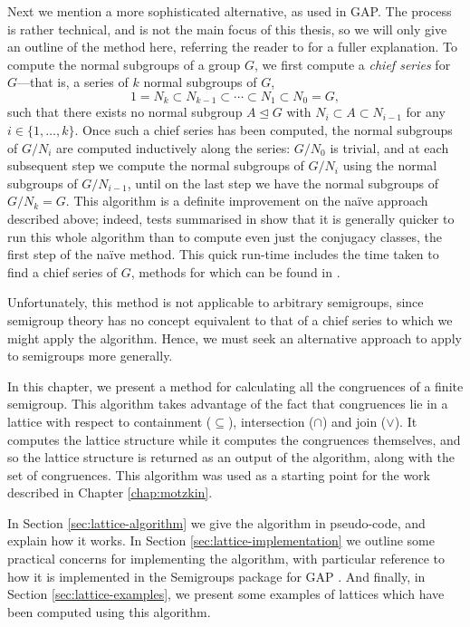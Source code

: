 Next we mention a more sophisticated alternative, as used in GAP.  The process
is rather technical, and is not the main focus of this thesis, so we will only
give an outline of the method here, referring the reader to \cite{hulpke_1998}
for a fuller explanation.  To compute the normal subgroups of a group $G$, we
first compute a \textit{chief series} for $G$---that is, a series of $k$ normal
subgroups of $G$, 
$$1 = N_k
\subset N_{k-1}
\subset \cdots
\subset N_1
\subset N_0 = G,$$
such that there exists no normal subgroup $A \trianglelefteq G$ with
$N_i \subset A \subset N_{i-1}$ for any $i \in \{1, \ldots, k\}$.
Once such a chief series has been computed, the normal subgroups of $G / N_i$
are computed inductively along the series: $G / N_0$ is trivial, and at each
subsequent step we compute the normal subgroups of $G / N_i$ using the normal
subgroups of $G / N_{i-1}$, until on the last step we have the normal subgroups
of $G / N_k = G$.  This algorithm is a definite improvement on the na\"ive
approach described above; indeed, tests summarised in \cite[Table
1]{hulpke_1998} show that it is generally quicker to run this whole algorithm
than to compute even just the conjugacy classes, the first step of the na\"ive
method.  This quick run-time includes the time taken to find a chief series of
$G$, methods for which can be found in \cite{chief_series}.


Unfortunately, this method is not applicable to arbitrary
semigroups, since semigroup theory has no concept equivalent to that of a chief
series to which we might apply the algorithm.  Hence, we must seek an
alternative approach to apply to semigroups more generally.

In this chapter, we present a method for calculating all the congruences of a
finite semigroup.  This algorithm takes advantage of the fact that congruences
lie in a lattice with respect to containment ($\subseteq$), intersection
($\cap$) and join ($\vee$).  It computes the lattice structure while it computes
the congruences themselves, and so the lattice structure is returned as an
output of the algorithm, along with the set of congruences.  This algorithm was
used as a starting point for the work described in Chapter \ref{chap:motzkin}.

In Section \ref{sec:lattice-algorithm} we give the algorithm in pseudo-code, and
explain how it works.  In Section \ref{sec:lattice-implementation} we outline
some practical concerns for implementing the algorithm, with particular
reference to how it is implemented in the Semigroups package \cite{semigroups}
for GAP \cite{gap}.  And finally, in Section \ref{sec:lattice-examples}, we
present some examples of lattices which have been computed using this algorithm.

